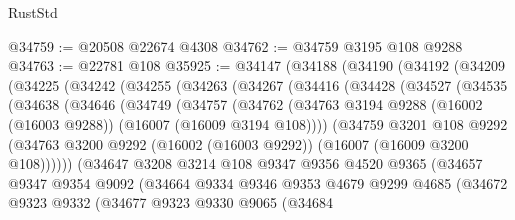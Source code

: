 \begin{lexlean}{RustStd}
\begin{coremodule}
@34759 := @20508 @22674 @4308
@34762 := @34759 @3195 @108 @9288
@34763 := @22781 @108
@35925 := @34147
    (@34188
      (@34190
        (@34192
          (@34209
            (@34225
              (@34242
                (@34255
                  (@34263
                    (@34267
                      (@34416
                        (@34428
                          (@34527
                            (@34535
                              (@34638
                                (@34646
                                  (@34749
                                    (@34757
                                      (@34762
                                        (@34763
                                          @3194
                                          @9288
                                          (@16002 (@16003 @9288))
                                          (@16007 (@16009 @3194 @108))))
                                      (@34759
                                        @3201
                                        @108
                                        @9292
                                        (@34763
                                          @3200
                                          @9292
                                          (@16002 (@16003 @9292))
                                          (@16007 (@16009 @3200 @108))))))
                                  (@34647
                                    @3208
                                    @3214
                                    @108
                                    @9347
                                    @9356
                                    @4520
                                    @9365
                                    (@34657
                                      @9347
                                      @9354
                                      @9092
                                      (@34664
                                        @9334
                                        @9346
                                        @9353
                                        @4679
                                        @9299
                                        @4685
                                        (@34672
                                          @9323
                                          @9332
                                          (@34677
                                            @9323
                                            @9330
                                            @9065
                                            (@34684

\end{coremodule}
\end{lexlean}
